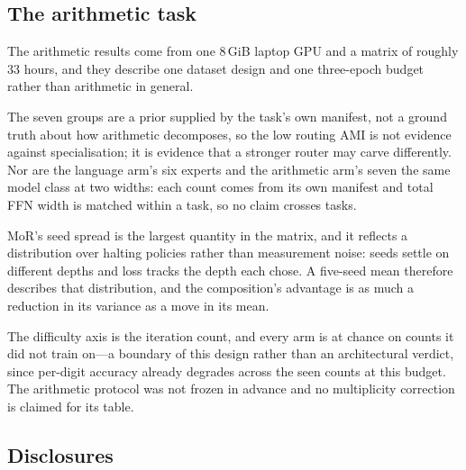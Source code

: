 \subsection{The arithmetic task}

The arithmetic results come from one 8\,GiB laptop GPU and a matrix of roughly
33 hours, and they describe one dataset design and one three-epoch budget rather
than arithmetic in general.

The seven groups are a prior supplied by the task's own manifest, not a ground
truth about how arithmetic decomposes, so the low routing AMI is not evidence
against specialisation; it is evidence that a stronger router may carve
differently. Nor are the language arm's six experts and the arithmetic arm's
seven the same model class at two widths: each count comes from its own manifest
and total FFN width is matched within a task, so no claim crosses tasks.

MoR's seed spread is the largest quantity in the matrix, and it reflects a
distribution over halting policies rather than measurement noise: seeds settle on
different depths and loss tracks the depth each chose. A five-seed mean therefore
describes that distribution, and the composition's advantage is as much a
reduction in its variance as a move in its mean.

The difficulty axis is the iteration count, and every arm is at chance on counts
it did not train on---a boundary of this design rather than an architectural
verdict, since per-digit accuracy already degrades across the seen counts at this
budget. The arithmetic protocol was not frozen in advance and no multiplicity
correction is claimed for its table.

\subsection{Disclosures}
\label{sec:honesty}

